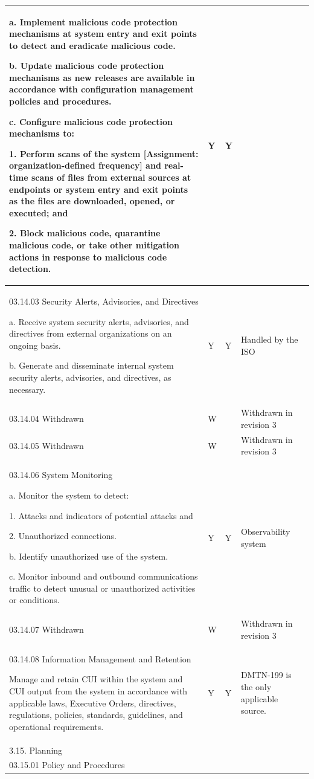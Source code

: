 \begin{longtable} {|p{}|p{}|p{}|p{} |}
{a. Implement malicious code protection mechanisms at system entry and exit points to detect and eradicate malicious code.

b. Update malicious code protection mechanisms as new releases are available in accordance with configuration management policies and procedures.

c. Configure malicious code protection mechanisms to:

1. Perform scans of the system [Assignment: organization-defined frequency] and real-time scans of files from external sources at endpoints or system entry and exit points as the files are downloaded, opened, or executed; and

2. Block malicious code, quarantine malicious code, or take other mitigation actions in response to malicious code detection.}&{Y}&{Y}& \\ \hline
{03.14.03 Security Alerts, Advisories, and Directives

a. Receive system security alerts, advisories, and directives from external organizations on an ongoing basis.

b. Generate and disseminate internal system security alerts, advisories, and directives, as necessary.}&{Y}&{Y}&{Handled by the ISO} \\ \hline
{03.14.04 Withdrawn}&{W}&{}&{Withdrawn in revision 3} \\ \hline
{03.14.05 Withdrawn}&{W}&{}&{Withdrawn in revision 3} \\ \hline
{03.14.06 System Monitoring

a. Monitor the system to detect:

1. Attacks and indicators of potential attacks and

2. Unauthorized connections.

b. Identify unauthorized use of the system.

c. Monitor inbound and outbound communications traffic to detect unusual or unauthorized activities or conditions.}&{Y}&{Y}&{Observability system} \\ \hline
{03.14.07 Withdrawn}&{W}&{}&{Withdrawn in revision 3} \\ \hline
{03.14.08 Information Management and Retention

Manage and retain CUI within the system and CUI output from the system in accordance with applicable laws, Executive Orders, directives, regulations, policies, standards, guidelines, and operational requirements.}&{Y}&{Y}&{DMTN-199 is the only applicable source.} \\ \hline
{3.15. Planning}&&& \\ \hline
{03.15.01 Policy and Procedures

}
\end{longtable}
